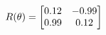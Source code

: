 \documentclass[preview]{standalone}
\begin{document}
\begin{align*}
\special{dvisvgm:raw <g id='unique000'>}R(\theta) = \begin{bmatrix}0.12 & -0.99\\0.99 & 0.12\end{bmatrix}\special{dvisvgm:raw </g>}
\end{align*}
\end{document}
